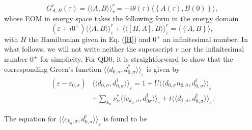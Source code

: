 \documentclass[aps,twocolumn,prb,superscript,floatfix,superscriptaddress,showpacs]{revtex4-1}
\newcommand{\ve}{\varepsilon}
\newcommand{\la}{\langle}
\newcommand{\ra}{\rangle}
\begin{document}
\begin{equation}
G^{r}_{A,B}\left(\tau\right)= {\la\la A, B \ra\ra}_{\tau}^{r}= -i \theta(\tau) \langle  \left\lbrace A(\tau), B(0)\right\rbrace\rangle,
\end{equation}
whose EOM in energy space takes the following form in the energy domain
\begin{equation}
(\ve+i0^{+}){\la\la A, B \ra\ra}_{\ve}^{r} + {\la\la \left[H,A \right], B \ra\ra}_{\ve}^{r}=\la \left\lbrace A, B \right\rbrace\ra,
\end{equation}
with $H$ the Hamiltonian given in Eq. (\ref{H}) and $0^{+}$ an infinitesimal number. In what follows, we will not write neither the superscript $r$ nor the infinitesimal number $0^{+}$ for simplicity. For QD0, it is straightforward to show that the corresponding Green's function ${\la\la d_{0,\sigma}, d_{0,\sigma}^{\dagger} \ra\ra}_{\ve}$ is given by
\begin{equation}
\begin{aligned}
\left(\ve-\ve_{0,\sigma}\right)& {\la\la d_{0,\sigma}, d_{0, \sigma}^{\dagger}\ra\ra}_{\ve}=1+ U {\la\la d_{0,\sigma} n_{0,\bar{\sigma}},d_{0,\sigma}^{\dagger} \ra\ra}_{\ve} \\ &+ \sum_{k_{\alpha}}\nu_{\alpha}^{*}\la\la c_{k_{\alpha},\sigma}, d_{0 \sigma}^{\dagger}\ra\ra_{\ve} + t\la\la d_{1,\sigma}, d_{0,\sigma}^{\dagger}\ra\ra_{\ve}.
\end{aligned}\label{GR000}
\end{equation}

The equation for ${\la\la c_{k_{\alpha},\sigma}, d_{0,\sigma}^{\dagger}\ra\ra}_{\ve}$ is found to be
\end{document}
